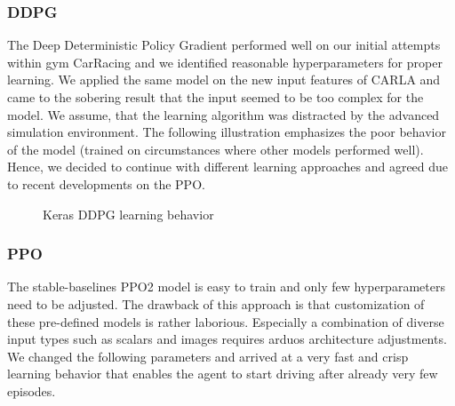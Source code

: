 \documentclass[letterpaper, 10 pt, conference]{ieeeconf}  %
\begin{document}
\subsubsection{DDPG}
The Deep Deterministic Policy Gradient performed well on our initial attempts within gym CarRacing 
and we identified reasonable hyperparameters for proper learning. We applied the same model 
on the new input features of CARLA and came to the sobering result that the input seemed to be 
too complex for the model. We assume, that the learning algorithm was distracted by the advanced 
simulation environment. The following illustration emphasizes the poor behavior of the model 
(trained on circumstances where other models performed well). Hence, we decided to continue with 
different learning approaches and agreed due to recent developments on the PPO.
\begin{figure}[thpb]
	\centering
	\caption{Keras DDPG learning behavior}
	\label{figurelabel}
\end{figure}

\subsubsection{PPO}
The stable-baselines PPO2 model is easy to train and only few hyperparameters need 
to be adjusted. The drawback of this approach is that customization of these pre-defined 
models is rather laborious. Especially a combination of diverse input types such as scalars and 
images requires arduos architecture adjustments. We changed the following parameters and arrived 
at a very fast and crisp learning behavior that enables the agent to start driving after already very few episodes.
\end{document}
